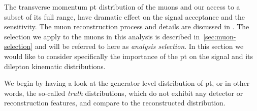 The transverse momentum \gls{pt} distribution of the muons and our access to a subset of its full range, have dramatic effect on the signal acceptance and the sensitivity. The muon reconstruction process and details are discussed in . The selection we apply to the muons in this analysis is described in~\ref{sec:muon-selection} and will be referred to here as \emph{analysis selection}. In this section we would like to consider specifically the importance of the \gls{pt} on the signal and its dilepton kinematic distributions.

We begin by having a look at the generator level distribution of \gls{pt}, or in other words, the so-called \emph{truth} distributions, which do not exhibit any detector or reconstruction features, and compare to the reconstructed distribution.

